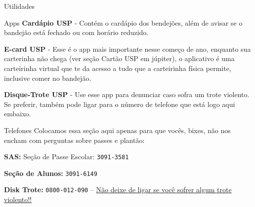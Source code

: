 \begin{secao}{Utilidades}
\begin{subsecao}{Apps}
{\bf Cardápio USP} - Contém o cardápio dos bendejões, além de avisar se o bandejão está fechado ou com horário reduzido.

{\bf E-card USP} - Esse é o app mais importante nesse começo de ano, enquanto sua carterinha não chega (ver seção Cartão USP em júpiter), o aplicativo é uma carteirinha virtual que te da acesso a tudo que a carteirinha física permite, inclusive comer no bandejão.

{\bf Disque-Trote USP} - Use esse app para denunciar caso sofra um trote violento. Se
preferir, também pode ligar para o número de telefone que está logo aqui embaixo.

\end{subsecao}

\begin{subsecao}{Telefones}
Colocamos essa seção aqui apenas para que vocês, bixes, não nos encham com perguntas
sobre passes e plantão:

{\bf SAS:} Seção de Passe Escolar: {\tt 3091-3581}

{\bf Seção de Alunos:} {\tt 3091-6149}

{\bf Disk Trote:} {\tt 0800-012-090} -- \underline{Não deixe de ligar se você sofrer algum trote violento!!}


\end{subsecao}
\end{secao}
